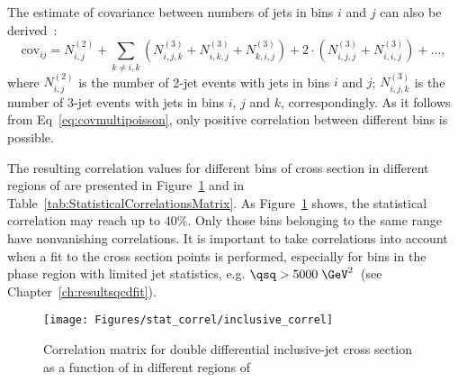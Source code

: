 The estimate of covariance between numbers of jets in bins $i$ and $j$ can also be derived~\cite{upub:juanstatcorrel}:
\begin{equation}
 \mathrm{cov}_{ij} = N_{i,j}^{\left(2\right)} + \sum_{k\neq i,k}{\left(N_{i,j,k}^{\left(3\right)} + N_{i,k,j}^{\left(3\right)} + N_{k,i,j}^{\left(3\right)} \right) + 2\cdot\left( N_{i,j,j}^{\left(3\right)} + N_{i,i,j}^{\left(3\right)} \right) + \ldots },
 \label{eq:covmultipoisson}
\end{equation}
where $N_{i,j}^{\left(2\right)}$ is the number of 2-jet events with jets in bins $i$ and $j$; $N_{i,j,k}^{\left(3\right)}$ is the number of 3-jet events with jets in bins $i$, $j$ and $k$, correspondingly. As it follows from Eq~\eqref{eq:covmultipoisson}, only positive correlation between different bins is possible.

The resulting correlation values for different bins of \dsdetjetb cross section in different regions of \qsq are presented in Figure~\ref{fig:correlmatrix} and in Table~\ref{tab:StatisticalCorrelationsMatrix}. As Figure~\ref{fig:correlmatrix} shows, the statistical correlation may reach up to $40\%$. Only those \etjetb bins belonging to the same \qsq range have nonvanishing correlations. It is important to take correlations into account when a fit to the cross section points is performed, especially for bins in the phase region with limited jet statistics, e.g. $\qsq > 5000\;\GeV^2$~(see Chapter~\ref{ch:resultsqcdfit}).
\begin{figure}
	\centering
		\texttt{[image: Figures/stat\_correl/inclusive\_correl]}
	\caption{Correlation matrix for double differential inclusive-jet cross section as a function of \etjetb in different regions of \qsq}
	\label{fig:correlmatrix}
\end{figure}
